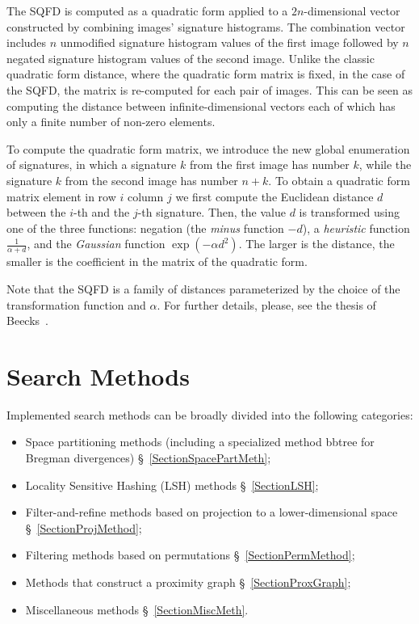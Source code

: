 \documentclass[runningheads,a4paper]{llncs}
\begin{document}
{The SQFD is computed as a quadratic form applied to a $2n$-dimensional vector constructed
by combining images' signature histograms. 
The combination vector includes
$n$ unmodified signature histogram values of the first image 
followed by $n$ negated signature histogram values of the second image. 
Unlike the classic quadratic form distance, where the quadratic form matrix is fixed,
in the case of the SQFD, the matrix is re-computed for each pair of images.
This can be seen as computing the distance between infinite-dimensional vectors
each of which has only a finite number of non-zero elements.

To compute the quadratic form matrix, we introduce the new global enumeration of signatures,
in which a signature $k$ from the first image has number $k$, while
the signature $k$ from the second image has number $n+k$.
To obtain a quadratic form matrix element in row $i$ column $j$ 
we first compute the Euclidean distance $d$ between the $i$-th and the $j$-th signature.
Then, the value $d$ is transformed using one of the three functions:
negation (the \emph{minus} function $-d$), a \emph{heuristic} function $\frac{1}{\alpha + d}$,
and the \emph{Gaussian} function $\exp(-\alpha d^2)$.
The larger is the distance, the smaller is the coefficient in the matrix of the quadratic form.

Note that the SQFD is a family of distances parameterized by the choice of the transformation
function and $\alpha$.
For further details, please, see the thesis of Beecks~\cite{Beecks:2013}.






\section{Search Methods}\label{SectionMethods}
Implemented search methods can be broadly divided into the following 
categories:
\begin{itemize}
\item Space partitioning methods (including a specialized method bbtree for Bregman divergences) \S~\ref{SectionSpacePartMeth};
\item Locality Sensitive Hashing (LSH) methods \S~\ref{SectionLSH};
\item Filter-and-refine methods based on projection to a lower-dimensional space \S~\ref{SectionProjMethod};
\item Filtering methods based on permutations \S~\ref{SectionPermMethod};
\item Methods that construct a proximity graph \S~\ref{SectionProxGraph};
\item Miscellaneous methods \S~\ref{SectionMiscMeth}.
\end{itemize}

}
\end{document}
